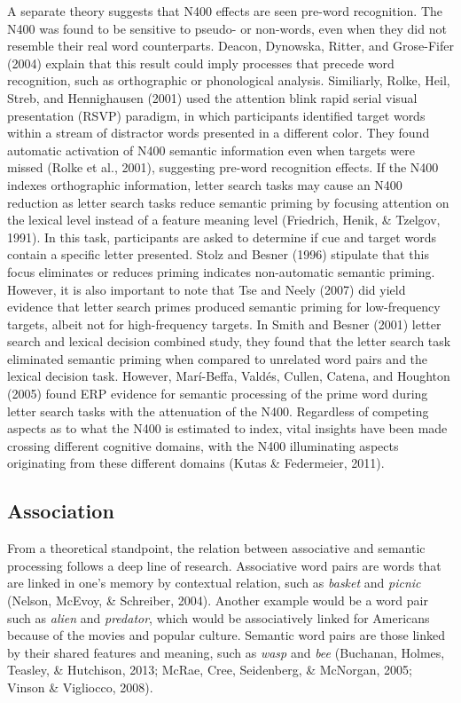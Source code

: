 \documentclass[english,man]{apa6}
\theoremstyle{definition}
\theoremstyle{definition}
\theoremstyle{remark}
\begin{document}
A separate theory suggests that N400 effects are seen pre-word
recognition. The N400 was found to be sensitive to pseudo- or non-words,
even when they did not resemble their real word counterparts. Deacon,
Dynowska, Ritter, and Grose-Fifer (2004) explain that this result could
imply processes that precede word recognition, such as orthographic or
phonological analysis. Similiarly, Rolke, Heil, Streb, and Hennighausen
(2001) used the attention blink rapid serial visual presentation (RSVP)
paradigm, in which participants identified target words within a stream
of distractor words presented in a different color. They found automatic
activation of N400 semantic information even when targets were missed
(Rolke et al., 2001), suggesting pre-word recognition effects. If the
N400 indexes orthographic information, letter search tasks may cause an
N400 reduction as letter search tasks reduce semantic priming by
focusing attention on the lexical level instead of a feature meaning
level (Friedrich, Henik, \& Tzelgov, 1991). In this task, participants
are asked to determine if cue and target words contain a specific letter
presented. Stolz and Besner (1996) stipulate that this focus eliminates
or reduces priming indicates non-automatic semantic priming. However, it
is also important to note that Tse and Neely (2007) did yield evidence
that letter search primes produced semantic priming for low-frequency
targets, albeit not for high-frequency targets. In Smith and Besner
(2001) letter search and lexical decision combined study, they found
that the letter search task eliminated semantic priming when compared to
unrelated word pairs and the lexical decision task. However, Marí-Beffa,
Valdés, Cullen, Catena, and Houghton (2005) found ERP evidence for
semantic processing of the prime word during letter search tasks with
the attenuation of the N400. Regardless of competing aspects as to what
the N400 is estimated to index, vital insights have been made crossing
different cognitive domains, with the N400 illuminating aspects
originating from these different domains (Kutas \& Federmeier, 2011).

\subsection{Association}\label{association}

From a theoretical standpoint, the relation between associative and
semantic processing follows a deep line of research. Associative word
pairs are words that are linked in one's memory by contextual relation,
such as \emph{basket} and \emph{picnic} (Nelson, McEvoy, \& Schreiber,
2004). Another example would be a word pair such as \emph{alien} and
\emph{predator}, which would be associatively linked for Americans
because of the movies and popular culture. Semantic word pairs are those
linked by their shared features and meaning, such as \emph{wasp} and
\emph{bee} (Buchanan, Holmes, Teasley, \& Hutchison, 2013; McRae, Cree,
Seidenberg, \& McNorgan, 2005; Vinson \& Vigliocco, 2008).
\end{document}
